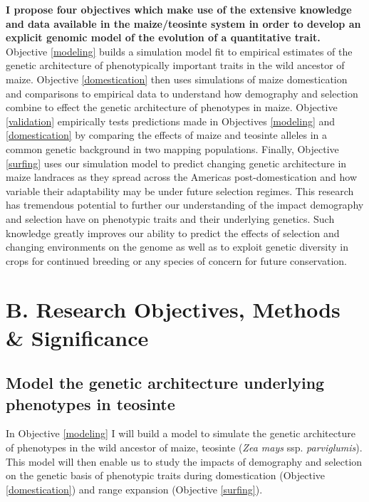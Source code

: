 \textbf{I propose four objectives which make use of the extensive knowledge and data available in the maize\//teosinte system in order to develop an explicit genomic model of the evolution of a quantitative trait.} Objective \ref{modeling} builds a simulation model fit to empirical estimates of the genetic architecture of phenotypically important traits in the wild ancestor of maize. Objective \ref{domestication} then uses simulations of maize domestication and comparisons to empirical data to understand how demography and selection combine to effect the genetic architecture of phenotypes in maize.  Objective \ref{validation} empirically tests  predictions made in Objectives \ref{modeling} and \ref{domestication} by comparing the effects of maize and teosinte alleles in a common genetic background in two mapping populations. Finally, Objective \ref{surfing} uses our simulation model to predict changing genetic architecture in maize landraces as they spread across the Americas post-domestication and how variable their adaptability may be under future selection regimes. This research has tremendous potential to further our understanding of the impact demography and selection have on phenotypic traits and their underlying genetics. Such knowledge greatly improves our ability to predict the effects of selection and changing environments on the genome as well as to exploit genetic diversity in crops for continued breeding or any species of concern for future conservation. \vspace{-3ex}


\section*{B. Research Objectives, Methods \& Significance}\vspace{-1ex}

\renewcommand\thesubsection{\Roman {subsection}}

\subsection{Model the genetic architecture underlying phenotypes in teosinte}\vspace{-1ex}
\label{modeling}
In Objective \ref{modeling} I will build a model to simulate the genetic architecture of phenotypes in the wild ancestor of maize, teosinte (\emph{Zea mays} ssp. \emph{parviglumis}). This model will then enable us to study the impacts of demography and selection on the genetic basis of phenotypic traits during domestication (Objective \ref{domestication}) and range expansion (Objective \ref{surfing}).

